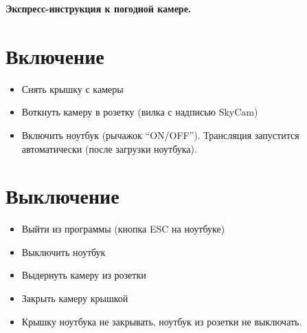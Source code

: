 \documentclass[a4paper,12pt,leqno,notitlepage]{article}
\begin{document}
\begin{center}
  {\Huge \bf Экспресс-инструкция к погодной камере.
}
\end{center}

\section{{\huge Включение}}
\Large
\begin{itemize}
\item Снять крышку с камеры
\item Воткнуть камеру в розетку (вилка с надписью SkyCam)
\item Включить ноутбук (рычажок ``ON/OFF''). Трансляция запустится автоматически
(после загрузки ноутбука).
\end{itemize}

\section{{\huge Выключение}}
\Large

\begin{itemize}
\item Выйти из программы (кнопка ESC на ноутбуке)
\item Выключить ноутбук
\item Выдернуть камеру из розетки
\item Закрыть камеру крышкой
\item Крышку ноутбука не закрывать, ноутбук из розетки не выключать.
\end{itemize}
\end{document}
